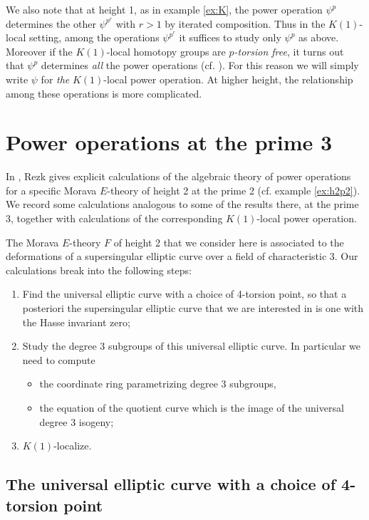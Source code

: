 \documentclass{gtpart}
\theoremstyle{definition}
\theoremstyle{remark}
\begin{document}
We also note that at height 1, as in example \ref{ex:K}, the power operation 
$\psi^p$ determines the other $\psi^{p^r}$ with $r > 1$ by iterated 
composition.  Thus in the $K(1)$-local setting, among the operations 
$\psi^{p^r}$ it suffices to study only $\psi^p$ as above.  Moreover if the 
$K(1)$-local homotopy groups are {\em $p$-torsion free}, it turns out that 
$\psi^p$ determines {\em all} the power operations (cf. 
\cite[section 3]{lpo}).  For this reason we will simply write $\psi$ for {\em 
the} $K(1)$-local power operation.  At higher height, the relationship among 
these operations is more complicated.  


\section{Power operations at the prime 3}
\label{sec:p3}

In \cite{h2p2}, Rezk gives explicit calculations of the algebraic theory of 
power operations for a specific Morava $E$-theory of height 2 at the prime 2 
(cf. example \ref{ex:h2p2}).  We record some calculations analogous to some of 
the results there, at the prime 3, together with calculations of the 
corresponding $K(1)$-local power operation.  

The Morava $E$-theory $F$ of height 2 that we consider here is associated to 
the deformations of a supersingular elliptic curve over a field of 
characteristic 3.  Our calculations break into the following steps: 
\begin{enumerate}
 \item Find the universal elliptic curve with a choice of 4-torsion  point, so 
 that a posteriori the supersingular elliptic curve that we are interested in 
 is one with the Hasse invariant zero; 
 \item Study the degree 3 subgroups of this universal elliptic curve.  In 
 particular we need to compute 
 \begin{itemize}
  \item the coordinate ring parametrizing degree 3 subgroups, 
  \item the equation of the quotient curve which is the image of the universal 
  degree 3 isogeny; 
 \end{itemize}
 \item $K(1)$-localize.  
\end{enumerate}


\subsection{The universal elliptic curve with a choice of 4-torsion point}
\label{subsec:step1}
\end{document}
